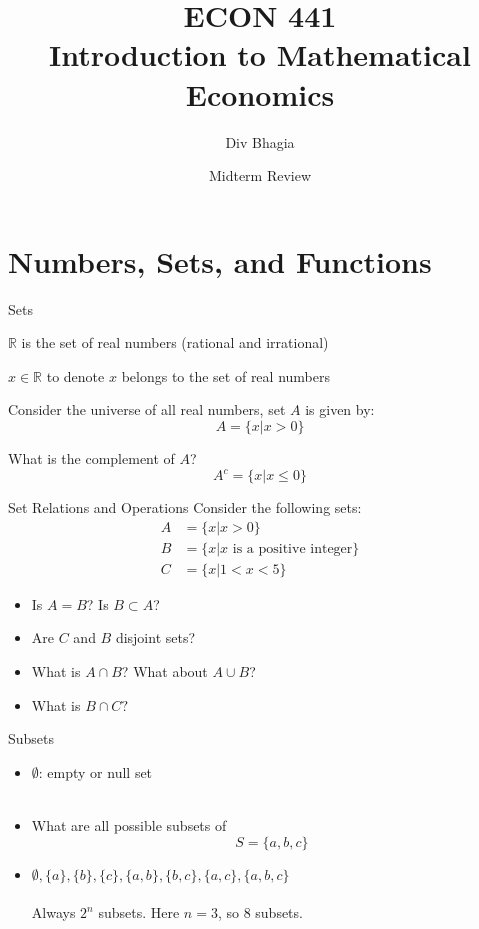 \documentclass{./../../Latex/teaching_slides}
\begin{document}
\title{ECON 441 \\ \vspace{0.4em} \normalsize Introduction to Mathematical Economics}
\author{Div Bhagia}
\date{Midterm Review}

\begin{frame}
\maketitle
\end{frame}

\section{Numbers, Sets, and Functions}
\begin{frame}{Sets}
\begin{witemize}
  \item $\mathbb{R}$ is the set of real numbers (rational and irrational)
  \item $x \in \mathbb{R}$ to denote $x$ belongs to the set of real numbers
  \item Consider the universe of all real numbers, set $A$ is given by:
  $$ A = \{x | x > 0\}$$
  \item What is the complement of $A$? \pause 
  $$ A^c = \{x | x \leq 0\}$$
  \end{witemize}
\end{frame}

\begin{frame}{Set Relations and Operations}
Consider the following sets:
\begin{align*}
A &= \{x | x > 0\} \\
B &= \{x | x \text{ is a positive integer}\} \\
C &= \{x | 1<x<5\}
\end{align*}
\begin{itemize}
\item Is $A=B$? Is $B \subset A$? 
\item Are $C$ and $B$ disjoint sets?
\item What is $A \cap B$? What about $A \cup B$?
\item What is $B \cap C?$ 
\end{itemize}
\end{frame}

\begin{frame}{Subsets}
\begin{itemize}
\item $\emptyset$: empty or null set \\~\\
\item  What are all possible subsets of $$S = \{a,b,c\}$$
\item[] $\emptyset, \{a\}, \{b\},\{c\}, \{a,b\}, \{b,c\}, \{a,c\}, \{a,b,c\}$  \\~\\
 Always $2^n$ subsets. Here $n=3$, so 8 subsets.
\end{itemize}
\end{frame}
\end{document}
